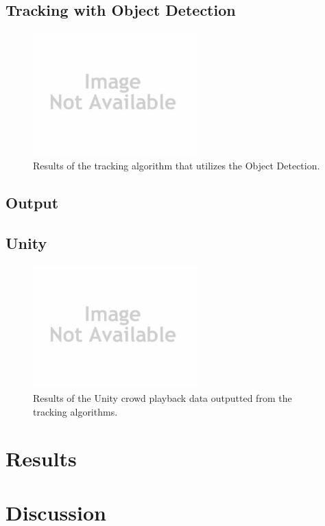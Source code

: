 \documentclass[conference]{IEEEtran}
\begin{document}
\subsection{Tracking with Object Detection}

\begin{figure}[!t]
\centering
\includegraphics[width=2.5in]{noImage.jpg}
\caption{Results of the tracking algorithm that utilizes the Object Detection.}
\label{Tracking_Object_Detection}
\end{figure}

\subsection{Output}

\subsection{Unity}

\begin{figure}[!t]
\centering
\includegraphics[width=2.5in]{noImage.jpg}
\caption{Results of the Unity crowd playback data outputted from the tracking algorithms.}
\label{Unity}
\end{figure}

\section{Results}

\section{Discussion}
\end{document}
